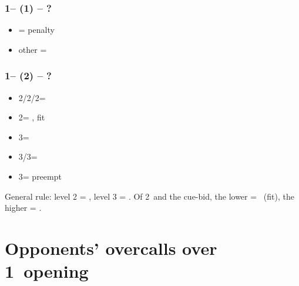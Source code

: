 \documentclass[12pt, a4paper]{report}
\begin{document}
{{{            \subsubsection*{1\hearts -- (1\nt) -- ?}
            \begin{itemize}
                \item \dbl = penalty
                \item other = \nat
            \end{itemize}

            \subsubsection*{1\hearts -- (2\clubs) -- ?}
            \begin{itemize}
                \item 2\diams/2\hearts/2\spades = \nat\ \nf
                \item 2\nt = \invp, fit
                \item 3\clubs = \mixed
                \item 3\diams/3\spades = \nat\ \gf
                \item 3\hearts = preempt
            \end{itemize}

            \vspace{0.3cm}
            General rule: level 2 = \nf, level 3 = \gf. Of 2\nt\ and the cue-bid, the lower = \invp\ (fit), the higher = \mixed.

        
        }

        \section*{\colorbox{blue!30}{Opponents' overcalls over 1\spades\ opening}}
         {

}}}
\end{document}
